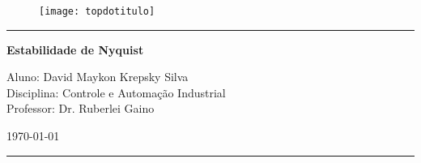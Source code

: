 \begin{titlepage}
\begin{center}
\begin{figure}[h]
\texttt{[image: topdotitulo]}
\end{figure}
\rule{\columnwidth}{1.5mm}



\vspace{4cm}

{\bf \Large Estabilidade de Nyquist}

\vspace{9cm}

\begin{flushleft}
Aluno: David Maykon Krepsky Silva \\
Disciplina: Controle e Automação Industrial\\
Professor: Dr. Ruberlei Gaino
\end{flushleft}
\vspace{2cm}

\today

\rule{\columnwidth}{1.3mm}
\end{center}
\end{titlepage}